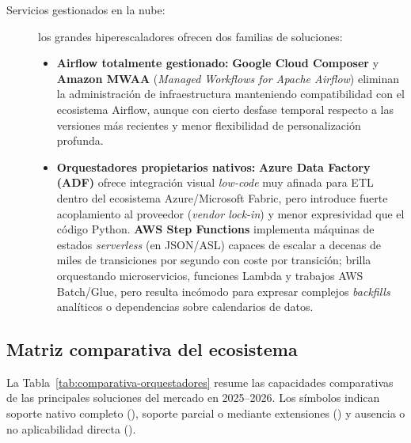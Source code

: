 \begin{description}
  \item[Servicios gestionados en la nube:] los grandes hiperescaladores ofrecen dos familias de soluciones:
  \begin{itemize}
    \item \textbf{Airflow totalmente gestionado:} \textbf{Google Cloud Composer} y \textbf{Amazon MWAA} (\textit{Managed Workflows for Apache Airflow}) eliminan la administración de infraestructura manteniendo compatibilidad con el ecosistema Airflow, aunque con cierto desfase temporal respecto a las versiones más recientes y menor flexibilidad de personalización profunda.
    \item \textbf{Orquestadores propietarios nativos:} \textbf{Azure Data Factory (ADF)} ofrece integración visual \textit{low-code} muy afinada para ETL dentro del ecosistema Azure/Microsoft Fabric, pero introduce fuerte acoplamiento al proveedor (\textit{vendor lock-in}) y menor expresividad que el código Python. \textbf{AWS Step Functions} implementa máquinas de estados \textit{serverless} (en JSON/ASL) capaces de escalar a decenas de miles de transiciones por segundo con coste por transición; brilla orquestando microservicios, funciones Lambda y trabajos AWS Batch/Glue, pero resulta incómodo para expresar complejos \textit{backfills} analíticos o dependencias sobre calendarios de datos.
  \end{itemize}
\end{description}

\subsection{Matriz comparativa del ecosistema}\label{subsec:matriz-orquestadores}

La Tabla~\ref{tab:comparativa-orquestadores} resume las capacidades comparativas de las principales soluciones del mercado en 2025--2026. Los símbolos indican soporte nativo completo (\yesmark), soporte parcial o mediante extensiones (\partialmark) y ausencia o no aplicabilidad directa (\nomark).

